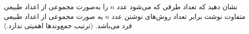 \EXERCISE
نشان دهید که تعداد طرقی که می‌شود عدد
$n$
را به‌صورت مجموعی از اعداد طبیعی متفاوت نوشت برابر تعداد روش‌های نوشتن عدد
$n$
به صورت مجموعی از اعداد طبیعی فرد می‌باشد. (ترتیب جمع‌وندها اهمیتی ندارد.)